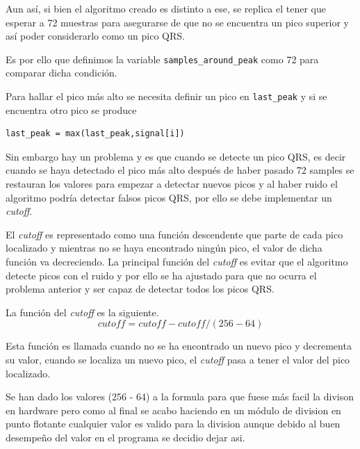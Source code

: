 Aun así, si bien el algoritmo creado es distinto a ese, se replica el tener que esperar a 72 muestras
para asegurarse de que no se encuentra un pico superior y así poder considerarlo como un pico QRS.

Es por ello que definimos la variable \lstinline|samples_around_peak| como 72 para comparar dicha condición.

Para hallar el pico más alto se necesita definir un pico en \lstinline|last_peak| y si se encuentra otro pico se produce

\lstset{language=python, breaklines=true, basicstyle=\footnotesize}
\begin{lstlisting}[frame=single]
last_peak = max(last_peak,signal[i])
\end{lstlisting}

Sin embargo hay un problema y es que cuando se detecte un pico QRS, es decir cuando se haya detectado el pico 
más alto después de haber pasado 72 samples se restauran los valores para empezar a detectar nuevos picos y al
haber ruido el algoritmo podría detectar falsos picos QRS, por ello se debe implementar un \textit{cutoff}.

El \textit{cutoff} es representado como una función descendente que parte de cada pico localizado y mientras no se haya
encontrado ningún pico, el valor de dicha función va decreciendo. La principal función del \textit{cutoff} es evitar que
el algoritmo detecte picos con el ruido y por ello se ha ajustado para que no ocurra el problema anterior y ser capaz de detectar todos los picos QRS.\@

La función del \textit{cutoff} es la siguiente.
    \[cutoff = cutoff - cutoff/(256 - 64)\]


Esta función es llamada cuando no se ha encontrado un nuevo pico y decrementa su valor, cuando se localiza un
nuevo pico, el \textit{cutoff} pasa a tener el valor del pico localizado.

Se han dado los valores (256 - 64) a la formula para que fuese más facil la divison en hardware pero como al final 
se acabo haciendo en un módulo de division en punto flotante cualquier valor es valido para la division aunque debido 
al buen desempeño del valor en el programa se decidio dejar asi.

